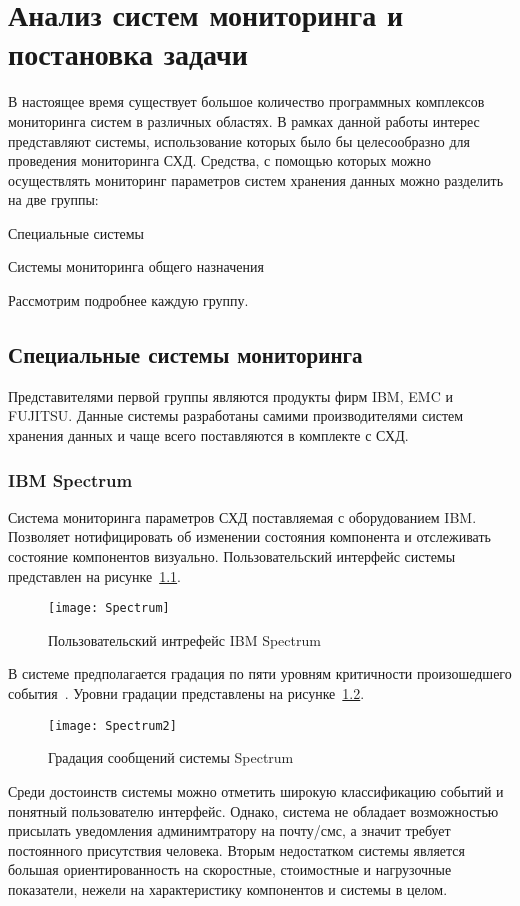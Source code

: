 \chapter{Анализ систем мониторинга и постановка задачи}
В настоящее время существует большое количество программных комплексов
мониторинга систем в различных областях. В рамках данной работы интерес представляют системы, использование которых было бы целесообразно для проведения мониторинга СХД.
Средства, с помощью которых можно осуществлять мониторинг параметров систем хранения данных можно разделить на две группы:
\begin{itemize*}
	\item{Специальные системы}
	\item{Системы мониторинга общего назначения}
\end{itemize*}
Рассмотрим подробнее каждую группу.
 
\section{Специальные системы мониторинга}
Представителями первой группы являются продукты фирм IBM, EMC и FUJITSU. Данные системы разработаны самими  производителями систем хранения данных и чаще всего поставляются в комплекте с СХД.

\subsection{IBM Spectrum}
Система мониторинга параметров СХД поставляемая с оборудованием IBM. Позволяет нотифицировать об изменении состояния компонента и отслеживать состояние компонентов визуально. Пользовательский интерфейс системы представлен на рисунке~\ref{fig:Spectrum}.
\begin{figure}[!h]
	\centering
	\texttt{[image: Spectrum]}
	\caption{Пользовательский интрефейс IBM Spectrum}
	\label{fig:Spectrum}
\end{figure}

В системе предполагается градация по пяти уровням критичности произошедшего события~\cite{Spectrum}. Уровни градации представлены на рисунке~\ref{fig:Spectrum2}.
\begin{figure}[!h]
	\centering
	\texttt{[image: Spectrum2]}
	\caption{Градация сообщений системы Spectrum}
	\label{fig:Spectrum2}
\end{figure}
Среди достоинств системы можно отметить широкую классификацию событий и понятный пользователю интерфейс. Однако, система не обладает возможностью присылать уведомления  админимтратору на почту/смс, а значит требует постоянного присутствия человека. Вторым недостатком системы является большая ориентированность на скоростные, стоимостные и нагрузочные показатели, нежели на характеристику компонентов и системы в целом. 
